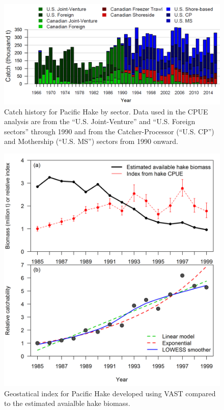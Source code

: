\documentclass[12pt,]{article}
\begin{document}
\begin{figure}[htbp]
\centering
\includegraphics{Figures/Hake_fishery_catch_history.png}
\caption{Catch history for Pacific Hake by sector. Data used in the CPUE
analysis are from the ``U.S. Joint-Venture'' and ``U.S. Foreign
sectors'' through 1990 and from the Catcher-Processor (``U.S. CP'') and
Mothership (``U.S. MS'') sectors from 1990 onward.\label{fig:ASHOP_X2}}
\end{figure}

\begin{figure}[htbp]
\centering
\includegraphics{Figures/ASHOP_catchability_illustration.png}
\caption{Geostatical index for Pacific Hake developed using VAST
compared to the estimated avaialble hake biomass.\label{fig:ASHOP_X3}}
\end{figure}
\end{document}
